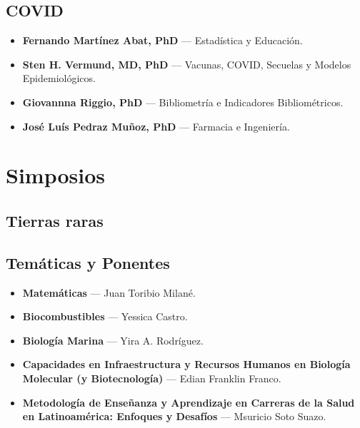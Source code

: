 \documentclass[11pt,a4paper]{article}
\begin{document}
\subsection{COVID}

\begin{itemize}[leftmargin=*, label={--}]
    \item \textbf{Fernando Martínez Abat, PhD} --- Estadística y Educación.
    \item \textbf{Sten H. Vermund, MD, PhD} --- Vacunas, COVID, Secuelas y Modelos Epidemiológicos.
    \item \textbf{Giovannna Riggio, PhD} --- Bibliometría e Indicadores Bibliométricos.
    \item \textbf{José Luís Pedraz Muñoz, PhD} --- Farmacia e Ingeniería.
\end{itemize}


\section{Simposios}
\subsection{Tierras raras}

\subsection{Temáticas y Ponentes}
\begin{itemize}[leftmargin=*, label={--}]
    \item \textbf{Matemáticas} --- Juan Toribio Milané.
    \item \textbf{Biocombustibles} --- Yessica Castro.
    \item \textbf{Biología Marina} --- Yira A. Rodríguez.
    \item \textbf{Capacidades en Infraestructura y Recursos Humanos en Biología Molecular (y Biotecnología)} --- Edian Franklin Franco.
    \item \textbf{Metodología de Enseñanza y Aprendizaje en Carreras de la Salud en Latinoamérica: Enfoques y Desafíos} --- Msuricio Soto Suazo.
\end{itemize}
\end{document}
